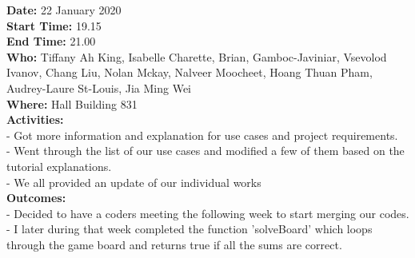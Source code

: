 \documentclass[12pt]{article}
\begin{document}
{\bf Date:} 22 January 2020 \\
{\bf Start Time:} 19.15 \\
{\bf End Time:} 21.00 \\
{\bf Who:} Tiffany Ah King, Isabelle Charette, Brian, Gamboc-Javiniar, Vsevolod Ivanov, Chang Liu, Nolan Mckay, Nalveer Moocheet, Hoang Thuan Pham, Audrey-Laure St-Louis, Jia Ming Wei \\
{\bf Where:} Hall Building 831 \\
{\bf Activities:}\\
- Got more information and explanation for use cases and project requirements.\\
- Went through the list of our use cases and modified a few of them based on the tutorial explanations.\\
- We all provided an update of our individual works\\
{\bf Outcomes:}\\
- Decided to have a coders meeting the following week to start merging our codes.\\
- I later during that week completed the function 'solveBoard' which loops through the game board and returns true if all the sums are correct.\\
\end{document}
